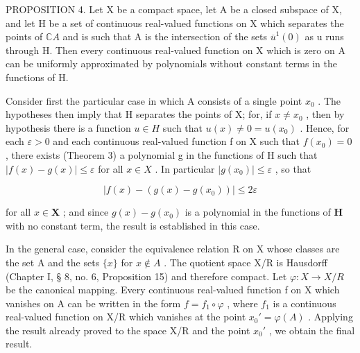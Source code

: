 PROPOSITION 4. Let X be a compact space, let A be a closed subspace of X, and let H be a set of continuous real-valued functions on X which separates the points of \(\mathbb{C}A\) and is such that A is the intersection of the sets \(\overline{u}^{1}(0)\) as u runs through H. Then every continuous real-valued function on X which is zero on A can be uniformly approximated by polynomials without constant terms in the functions of H.

Consider first the particular case in which A consists of a single point \(x_{0}\) . The hypotheses then imply that H separates the points of X; for, if \(x \neq x_{0}\) , then by hypothesis there is a function \(u \in H\) such that \(u(x) \neq 0 = u(x_{0})\) . Hence, for each \(\varepsilon > 0\) and each continuous real-valued function f on X such that \(f(x_{0}) = 0\) , there exists (Theorem 3) a polynomial g in the functions of H such that \(|f(x) - g(x)| \leqslant \varepsilon\) for all \(x \in X\) . In particular \(|g(x_{0})| \leqslant \varepsilon\) , so that

\[
\left| f (x) - \left(g (x) - g \left(x _ {0}\right)\right) \right| \leqslant 2 \varepsilon
\]

for all \(x \in \mathbf{X}\) ; and since \(g(x) - g(x_0)\) is a polynomial in the functions of \(\mathbf{H}\) with no constant term, the result is established in this case.

In the general case, consider the equivalence relation R on X whose classes are the set A and the sets \(\{x\}\) for \(x \notin A\) . The quotient space X/R is Hausdorff (Chapter I, § 8, no. 6, Proposition 15) and therefore compact. Let \(\varphi: X \to X/R\) be the canonical mapping. Every continuous real-valued function f on X which vanishes on A can be written in the form \(f = f_{1} \circ \varphi\) , where \(f_{1}\) is a continuous real-valued function on X/R which vanishes at the point \(x_{0}' = \varphi(A)\) . Applying the result already proved to the space X/R and the point \(x_{0}'\) , we obtain the final result.

